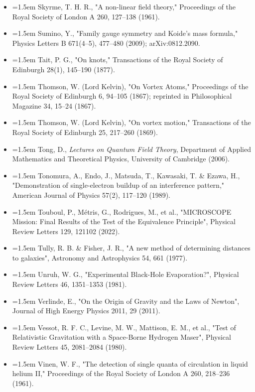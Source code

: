 \documentclass[11pt,a4paper]{article}
\begin{document}
\begin{itemize}[leftmargin=1.5em,label={}]
\item \hangindent=1.5em Skyrme, T. H. R., "A non-linear field theory," Proceedings of the Royal Society of London A 260, 127–138 (1961).
\item \hangindent=1.5em Sumino, Y., "Family gauge symmetry and Koide's mass formula," Physics Letters B 671(4–5), 477–480 (2009); arXiv:0812.2090.
\item \hangindent=1.5em Tait, P. G., "On knots," Transactions of the Royal Society of Edinburgh 28(1), 145–190 (1877).
\item \hangindent=1.5em Thomson, W. (Lord Kelvin), "On Vortex Atoms," Proceedings of the Royal Society of Edinburgh 6, 94–105 (1867); reprinted in Philosophical Magazine 34, 15–24 (1867).
\item \hangindent=1.5em Thomson, W. (Lord Kelvin), "On vortex motion," Transactions of the Royal Society of Edinburgh 25, 217–260 (1869).
\item \hangindent=1.5em Tong, D., \emph{Lectures on Quantum Field Theory}, Department of Applied Mathematics and Theoretical Physics, University of Cambridge (2006).
\item \hangindent=1.5em Tonomura, A., Endo, J., Matsuda, T., Kawasaki, T. \& Ezawa, H., "Demonstration of single-electron buildup of an interference pattern," American Journal of Physics 57(2), 117–120 (1989).
\item \hangindent=1.5em Touboul, P., Métris, G., Rodrigues, M., et al., "MICROSCOPE Mission: Final Results of the Test of the Equivalence Principle", Physical Review Letters 129, 121102 (2022).
\item \hangindent=1.5em Tully, R. B. \& Fisher, J. R., "A new method of determining distances to galaxies", Astronomy and Astrophysics 54, 661 (1977).
\item \hangindent=1.5em Unruh, W. G., "Experimental Black-Hole Evaporation?", Physical Review Letters 46, 1351–1353 (1981).
\item \hangindent=1.5em Verlinde, E., "On the Origin of Gravity and the Laws of Newton", Journal of High Energy Physics 2011, 29 (2011).
\item \hangindent=1.5em Vessot, R. F. C., Levine, M. W., Mattison, E. M., et al., "Test of Relativistic Gravitation with a Space-Borne Hydrogen Maser", Physical Review Letters 45, 2081–2084 (1980).
\item \hangindent=1.5em Vinen, W. F., "The detection of single quanta of circulation in liquid helium II," Proceedings of the Royal Society of London A 260, 218–236 (1961).

\end{itemize}
\end{document}
